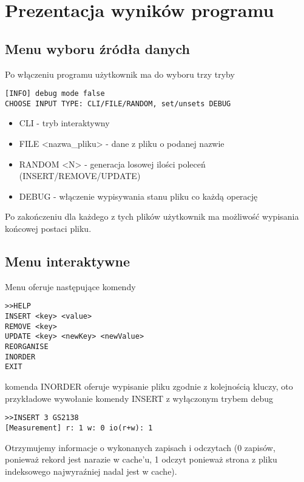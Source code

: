 \documentclass{article}
\begin{document}
\section{Prezentacja wyników programu}
\subsection{Menu wyboru źródła danych}
Po włączeniu programu użytkownik ma do wyboru trzy tryby
\begin{lstlisting}
[INFO] debug mode false
CHOOSE INPUT TYPE: CLI/FILE/RANDOM, set/unsets DEBUG
\end{lstlisting}
\begin{itemize}
	\item CLI - tryb interaktywny
	\item FILE <nazwa\_pliku> - dane z pliku o podanej nazwie
	\item RANDOM <N> - generacja losowej ilości poleceń (INSERT/REMOVE/UPDATE)
	\item DEBUG - włączenie wypisywania stanu pliku co każdą operację
\end{itemize}
Po zakończeniu dla każdego z tych plików użytkownik ma możliwość wypisania końcowej postaci pliku.
\subsection{Menu interaktywne}
Menu oferuje następujące komendy
\begin{lstlisting}
>>HELP
INSERT <key> <value>
REMOVE <key>
UPDATE <key> <newKey> <newValue>
REORGANISE
INORDER
EXIT
\end{lstlisting}
komenda INORDER oferuje wypisanie pliku zgodnie z kolejnością kluczy,
oto przykładowe wywołanie komendy INSERT z wyłączonym trybem debug
\begin{lstlisting}
>>INSERT 3 GS2138
[Measurement] r: 1 w: 0 io(r+w): 1
\end{lstlisting}
Otrzymujemy informacje o wykonanych zapisach i odczytach (0 zapisów, ponieważ rekord jest narazie w cache'u, 1 odczyt ponieważ strona z pliku indeksowego najwyraźniej nadal jest w cache).
\end{document}
